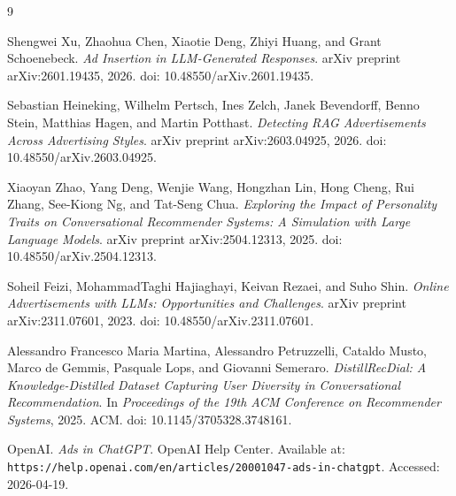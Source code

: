 \documentclass{article}
\begin{document}
\begin{thebibliography}{9}

Shengwei Xu, Zhaohua Chen, Xiaotie Deng, Zhiyi Huang, and Grant Schoenebeck.
\textit{Ad Insertion in LLM-Generated Responses}.
arXiv preprint arXiv:2601.19435, 2026.
doi: 10.48550/arXiv.2601.19435.

Sebastian Heineking, Wilhelm Pertsch, Ines Zelch, Janek Bevendorff, Benno Stein, Matthias Hagen, and Martin Potthast.
\textit{Detecting RAG Advertisements Across Advertising Styles}.
arXiv preprint arXiv:2603.04925, 2026.
doi: 10.48550/arXiv.2603.04925.

Xiaoyan Zhao, Yang Deng, Wenjie Wang, Hongzhan Lin, Hong Cheng, Rui Zhang, See-Kiong Ng, and Tat-Seng Chua.
\textit{Exploring the Impact of Personality Traits on Conversational Recommender Systems: A Simulation with Large Language Models}.
arXiv preprint arXiv:2504.12313, 2025.
doi: 10.48550/arXiv.2504.12313.

Soheil Feizi, MohammadTaghi Hajiaghayi, Keivan Rezaei, and Suho Shin.
\textit{Online Advertisements with LLMs: Opportunities and Challenges}.
arXiv preprint arXiv:2311.07601, 2023.
doi: 10.48550/arXiv.2311.07601.

Alessandro Francesco Maria Martina, Alessandro Petruzzelli, Cataldo Musto, Marco de Gemmis, Pasquale Lops, and Giovanni Semeraro.
\textit{DistillRecDial: A Knowledge-Distilled Dataset Capturing User Diversity in Conversational Recommendation}.
In \textit{Proceedings of the 19th ACM Conference on Recommender Systems}, 2025.
ACM.
doi: 10.1145/3705328.3748161.

OpenAI. \emph{Ads in ChatGPT}. OpenAI Help Center. Available at:
\texttt{https://help.openai.com/en/articles/20001047-ads-in-chatgpt}.
Accessed: 2026-04-19.

\end{thebibliography}
\end{document}
